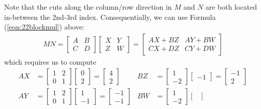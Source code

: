 \begin{solution}
Note that the cuts along the column/row direction in $M$ and $N$ are both located in-between the $2$nd-$3$rd index. Consequentially, we can use Formula (\ref{eqn:22blockmul}) above:
\begin{align*}
MN = 
\begin{bmatrix}
A & B \\
C & D
\end{bmatrix} 
\begin{bmatrix}
X & Y \\
Z & W
\end{bmatrix} 
=
\begin{bmatrix}
AX + BZ & AY + BW \\
CX + DZ & CY + DW
\end{bmatrix}
\end{align*}
which requires us to compute
\begin{align*}
AX &=
\begin{bmatrix}
1 & 2 \\
0 & 1
\end{bmatrix}
\begin{bmatrix}
0 \\
2 
\end{bmatrix}
=
\begin{bmatrix}
4 \\
2
\end{bmatrix}
&
BZ &=
\begin{bmatrix}
1 \\
-2
\end{bmatrix}
\begin{bmatrix}
-1
\end{bmatrix}
=
\begin{bmatrix}
-1 \\
2
\end{bmatrix} \\
AY &=
\begin{bmatrix}
1 & 2 \\
0 & 1
\end{bmatrix}
\begin{bmatrix}
1 \\
-1
\end{bmatrix}
=
\begin{bmatrix}
-1 \\
-1
\end{bmatrix}
&
BW &=
\begin{bmatrix}
1 \\
-2
\end{bmatrix}
\begin{bmatrix}

\end{bmatrix}
\end{align*}
\end{solution}
